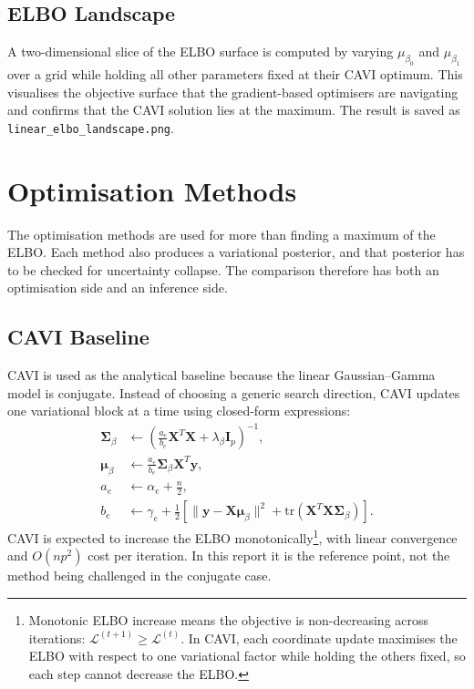 \documentclass[11pt,a4paper]{article}
\newcommand{\tr}{\text{tr}}
\begin{document}
\subsection{ELBO Landscape}

A two-dimensional slice of the ELBO surface is computed by varying $\mu_{\beta_0}$ and $\mu_{\beta_1}$
over a grid while holding all other parameters fixed at their CAVI optimum.
This visualises the objective surface that the gradient-based optimisers are navigating and confirms
that the CAVI solution lies at the maximum.
The result is saved as \texttt{linear\_elbo\_landscape.png}.

\section{Optimisation Methods}

The optimisation methods are used for more than finding a maximum of the ELBO. Each method also produces a variational posterior, and that posterior has to be checked for uncertainty collapse. The comparison therefore has both an optimisation side and an inference side.

\subsection{CAVI Baseline}

CAVI is used as the analytical baseline because the linear Gaussian--Gamma model is conjugate. Instead of choosing a generic search direction, CAVI updates one variational block at a time using closed-form expressions:
\begin{align}
\bm{\Sigma}_\beta &\leftarrow \left(\frac{a_e}{b_e} \bm{X}^T\bm{X} + \lambda_\beta \bm{I}_p\right)^{-1},\\
\bm{\mu}_\beta &\leftarrow \frac{a_e}{b_e} \bm{\Sigma}_\beta \bm{X}^T\bm{y},\\
a_e &\leftarrow \alpha_e + \frac{n}{2},\\
b_e &\leftarrow \gamma_e + \frac{1}{2}\left[\|\bm{y} - \bm{X}\bm{\mu}_\beta\|^2 + \tr(\bm{X}^T\bm{X}\bm{\Sigma}_\beta)\right].
\end{align}
CAVI is expected to increase the ELBO monotonically\footnote{Monotonic ELBO increase means the objective is non-decreasing across iterations: $\mathcal{L}^{(t+1)} \geq \mathcal{L}^{(t)}$. In CAVI, each coordinate update maximises the ELBO with respect to one variational factor while holding the others fixed, so each step cannot decrease the ELBO.}, with linear convergence and $O(np^2)$ cost per iteration. In this report it is the reference point, not the method being challenged in the conjugate case.
\end{document}
